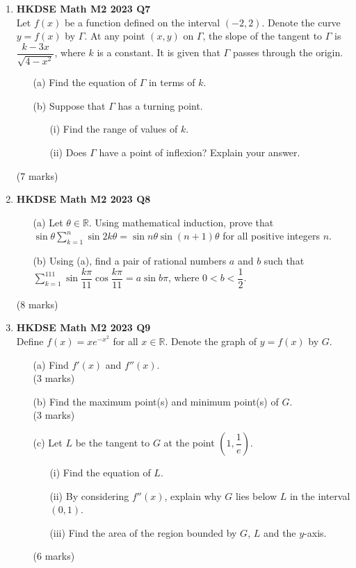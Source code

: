 \documentclass{report}
\begin{document}
\begin{enumerate}
	\item \textbf{HKDSE Math M2 2023 Q7}\\
	Let $f(x)$ be a function defined on the interval $(-2,2)$. Denote the curve $y = f(x)$ by $\Gamma$. At any point $(x,y)$ on $\Gamma$, the slope of the tangent to $\Gamma$ is $\dfrac{k - 3x}{\sqrt{4-x^2}}$, where $k$ is a constant. It is given that $\Gamma$ passes through the origin.
	\begin{enumerate}
		\item [(a)]Find the equation of $\Gamma$ in terms of $k$.
		\item [(b)]Suppose that $\Gamma$ has a turning point.
		\begin{enumerate}
			\item [(i)]Find the range of values of $k$.
			\item [(ii)]Does $\Gamma$ have a point of inflexion? Explain your answer.
		\end{enumerate}
	\end{enumerate}
	(7 marks)

	\newpage

	\item \textbf{HKDSE Math M2 2023 Q8}
	\begin{enumerate}
		\item [(a)]Let $\theta \in \mathbb{R}$. Using mathematical induction, prove that $\displaystyle \sin{\theta}\sum_{k=1}^{n}\sin{2k\theta} = \sin{n\theta}\sin{(n+1)\theta}$ for all positive integers $n$.
		\item [(b)] Using (a), find a pair of rational numbers $a$ and $b$ such that $\displaystyle\sum_{k = 1}^{111}\sin{\dfrac{k\pi}{11}}\cos{\dfrac{k\pi}{11}} = a\sin{b\pi}$, where $0 < b < \dfrac{1}{2}$.
	\end{enumerate}
	(8 marks)

	\item \textbf{HKDSE Math M2 2023 Q9}\\
	Define $ f(x) = xe^{-x^2}$ for all $x\in \mathbb{R}$. Denote the graph of $y = f(x)$ by $G$.
	\begin{enumerate}
		\item [(a)]Find $f'(x)$ and $f''(x)$. \\(3 marks)
		\item [(b)]Find the maximum point(s) and minimum point(s) of $G$. \\(3 marks)
		\item [(c)]Let $L$ be the tangent to $G$ at the point $\left(1,\dfrac{1}{e}\right)$.
		\begin{enumerate}
			\item [(i)]Find the equation of $L$.
			\item [(ii)]By considering $f''(x)$, explain why $G$ lies below $L$ in the interval $(0,1)$.
			\item [(iii)]Find the area of the region bounded by $G$, $L$ and the $y$-axis.
		\end{enumerate}
		(6 marks)
	\end{enumerate}


\end{enumerate}
\end{document}
